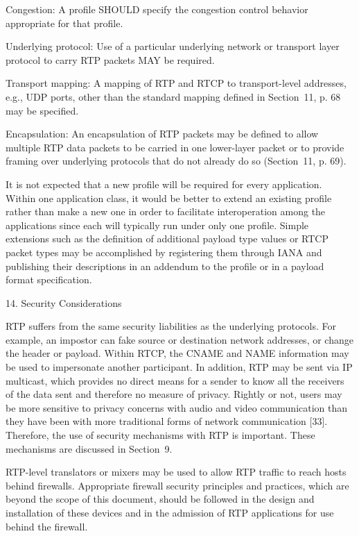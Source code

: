 \documentclass{article}
\begin{document}
Congestion: A profile SHOULD specify the congestion control behavior appropriate for that profile.

Underlying protocol: Use of a particular underlying network or transport layer protocol to carry RTP packets MAY be required.

Transport mapping: A mapping of RTP and RTCP to transport-level addresses, e.g., UDP ports, other than the standard mapping defined in Section~11, p. 68 may be specified.

Encapsulation: An encapsulation of RTP packets may be defined to allow multiple RTP data packets to be carried in one lower-layer packet or to provide framing over underlying protocols that do not already do so (Section~11, p. 69).

It is not expected that a new profile will be required for every application.  Within one application class, it would be better to extend an existing profile rather than make a new one in order to facilitate interoperation among the applications since each will typically run under only one profile.  Simple extensions such as the definition of additional payload type values or RTCP packet types may be accomplished by registering them through IANA and publishing their descriptions in an addendum to the profile or in a payload format specification.

14. Security Considerations

RTP suffers from the same security liabilities as the underlying protocols.  For example, an impostor can fake source or destination network addresses, or change the header or payload.  Within RTCP, the CNAME and NAME information may be used to impersonate another participant.  In addition, RTP may be sent via IP multicast, which provides no direct means for a sender to know all the receivers of the data sent and therefore no measure of privacy.  Rightly or not, users may be more sensitive to privacy concerns with audio and video communication than they have been with more traditional forms of network communication [33].  Therefore, the use of security mechanisms with RTP is important.  These mechanisms are discussed in Section~9.

RTP-level translators or mixers may be used to allow RTP traffic to reach hosts behind firewalls.  Appropriate firewall security principles and practices, which are beyond the scope of this document, should be followed in the design and installation of these devices and in the admission of RTP applications for use behind the firewall.
\end{document}

